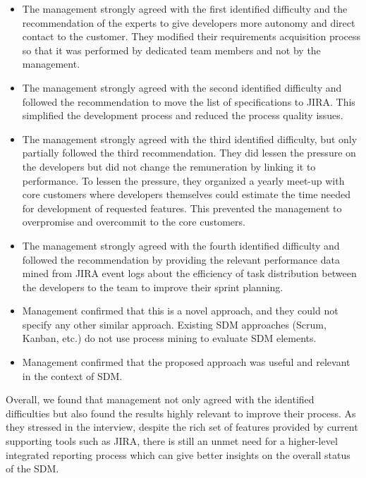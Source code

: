 \begin{itemize}
	\item The management strongly agreed with the first identified difficulty and the recommendation of the experts to give developers more autonomy and direct contact to the customer. They modified their requirements acquisition process so that it was performed by dedicated team members and not by the management.
	
	\item The management strongly agreed with the second identified difficulty and followed the recommendation to move the list of specifications to JIRA. This simplified the development process and reduced the process quality issues.
	
	\item The management strongly agreed with the third identified difficulty, but only partially followed the third recommendation. They did lessen the pressure on the developers but did not change the remuneration by linking it to performance. To lessen the pressure, they organized a yearly meet-up with core customers where developers themselves could estimate the time needed for development of requested features.  This prevented the management to overpromise and overcommit to the core customers.
	
	\item The management strongly agreed with the fourth identified difficulty and followed the recommendation by providing the relevant performance data mined from JIRA event logs about the efficiency of task distribution between the developers to the team to improve their sprint planning.
	
	\item Management confirmed that this is a novel approach, and they could not specify any other similar approach. Existing SDM approaches (Scrum, Kanban, etc.) do not use process mining to evaluate SDM elements. 
	
	\item Management confirmed that the proposed approach was useful and relevant in the context of SDM.
	
\end{itemize}
	
Overall, we found that management not only agreed with the identified difficulties but also found the results highly relevant to improve their process. As they stressed in the interview, despite the rich set of features provided by current supporting tools such as JIRA, there is still an unmet need for a higher-level integrated reporting process which can give better insights on the overall status of the SDM. 


